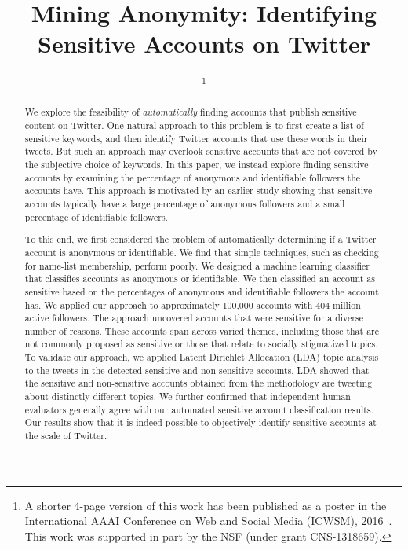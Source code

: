 \documentclass[conference]{IEEEtran}
\begin{document}
\title{Mining Anonymity: Identifying Sensitive Accounts on Twitter}

\author{
\thanks{A shorter 4-page version of this work has been published as a poster in the International AAAI Conference on Web and Social Media (ICWSM), 2016~\cite{PeddintiICWSM}. This work was supported in part by the NSF (under grant CNS-1318659).}
}

\maketitle

\begin{abstract} 

We explore the feasibility of {\em automatically} finding accounts that publish sensitive content on Twitter. One natural approach to this problem is to first create a list of sensitive keywords, and then identify Twitter accounts that use these words in their tweets. But such an approach may overlook sensitive accounts that are not covered by the subjective choice of keywords. In this paper, we instead explore finding sensitive accounts by examining the percentage of anonymous and identifiable followers the accounts have. This approach is motivated by an earlier study showing that sensitive accounts typically have a large percentage of anonymous followers and a small percentage of identifiable followers. 

To this end, we first considered the problem of automatically determining if a Twitter account is anonymous or identifiable. We find that simple techniques, such as checking for name-list membership, perform poorly.  
We designed a machine learning classifier that classifies accounts as anonymous or identifiable. 
We then classified an account as sensitive based on  the percentages of anonymous and identifiable followers the account has. We applied our approach to approximately 100,000 accounts with 404 million active followers. The approach uncovered accounts that were sensitive for a diverse number of reasons. These accounts span across varied themes, including those that are not commonly proposed as sensitive or those that relate to socially stigmatized topics. To validate our approach, we applied Latent Dirichlet Allocation (LDA) topic analysis to the tweets in the detected sensitive and non-sensitive accounts. LDA showed that the sensitive and non-sensitive accounts obtained from the methodology are tweeting about distinctly different topics. We further confirmed that independent human evaluators generally agree with our automated sensitive account classification results. Our results show that it is indeed possible to objectively identify sensitive accounts at the scale of Twitter.

\end{abstract}
\end{document}
